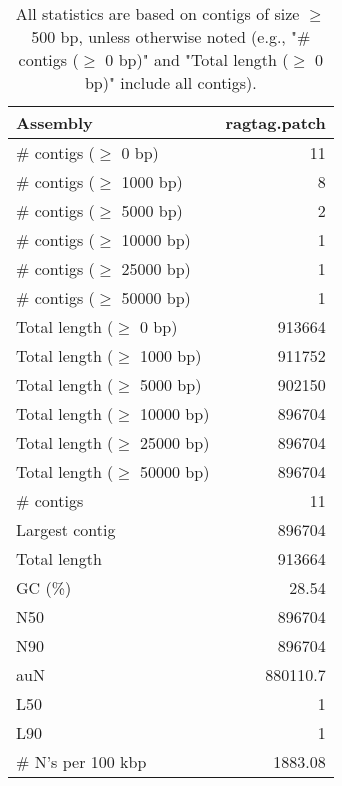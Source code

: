 \documentclass[12pt,a4paper]{article}
\begin{document}
\begin{table}[ht]
\begin{center}
\caption{All statistics are based on contigs of size $\geq$ 500 bp, unless otherwise noted (e.g., "\# contigs ($\geq$ 0 bp)" and "Total length ($\geq$ 0 bp)" include all contigs).}
\begin{tabular}{|l*{1}{|r}|}
\hline
Assembly & ragtag.patch \\ \hline
\# contigs ($\geq$ 0 bp) & 11 \\ \hline
\# contigs ($\geq$ 1000 bp) & 8 \\ \hline
\# contigs ($\geq$ 5000 bp) & 2 \\ \hline
\# contigs ($\geq$ 10000 bp) & 1 \\ \hline
\# contigs ($\geq$ 25000 bp) & 1 \\ \hline
\# contigs ($\geq$ 50000 bp) & 1 \\ \hline
Total length ($\geq$ 0 bp) & 913664 \\ \hline
Total length ($\geq$ 1000 bp) & 911752 \\ \hline
Total length ($\geq$ 5000 bp) & 902150 \\ \hline
Total length ($\geq$ 10000 bp) & 896704 \\ \hline
Total length ($\geq$ 25000 bp) & 896704 \\ \hline
Total length ($\geq$ 50000 bp) & 896704 \\ \hline
\# contigs & 11 \\ \hline
Largest contig & 896704 \\ \hline
Total length & 913664 \\ \hline
GC (\%) & 28.54 \\ \hline
N50 & 896704 \\ \hline
N90 & 896704 \\ \hline
auN & 880110.7 \\ \hline
L50 & 1 \\ \hline
L90 & 1 \\ \hline
\# N's per 100 kbp & 1883.08 \\ \hline
\end{tabular}
\end{center}
\end{table}
\end{document}
